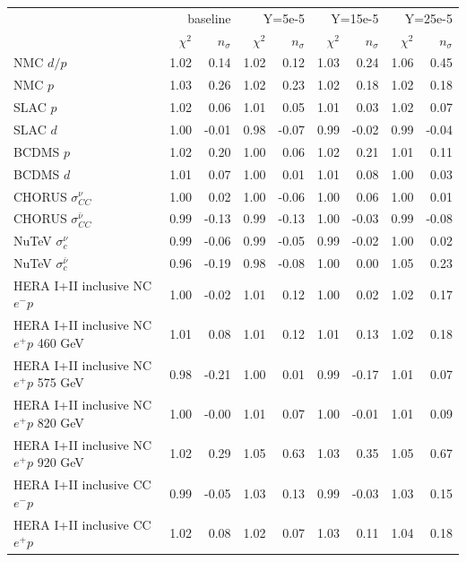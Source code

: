 \documentclass[withindex,glossary]{cam-thesis}
\begin{document}
\begin{table}[H]
        \tiny
        \centering
\label{tab:chi2_y}
\begin{tabular}{lrrrrrrrr}
\toprule
 & \multicolumn{2}{r}{baseline} & \multicolumn{2}{r}{Y=5e-5} & \multicolumn{2}{r}{Y=15e-5} & \multicolumn{2}{r}{Y=25e-5} \\
 & $\chi^2$ & $n_\sigma$ & $\chi^2$ & $n_\sigma$ & $\chi^2$ & $n_\sigma$ & $\chi^2$ & $n_\sigma$ \\
\midrule
NMC $d/p$ & 1.02 & 0.14 & 1.02 & 0.12 & 1.03 & 0.24 & 1.06 & 0.45 \\
NMC $p$ & 1.03 & 0.26 & 1.02 & 0.23 & 1.02 & 0.18 & 1.02 & 0.18 \\
SLAC $p$ & 1.02 & 0.06 & 1.01 & 0.05 & 1.01 & 0.03 & 1.02 & 0.07 \\
SLAC $d$ & 1.00 & -0.01 & 0.98 & -0.07 & 0.99 & -0.02 & 0.99 & -0.04 \\
BCDMS $p$ & 1.02 & 0.20 & 1.00 & 0.06 & 1.02 & 0.21 & 1.01 & 0.11 \\
BCDMS $d$ & 1.01 & 0.07 & 1.00 & 0.01 & 1.01 & 0.08 & 1.00 & 0.03 \\
CHORUS $\sigma_{CC}^{\nu}$ & 1.00 & 0.02 & 1.00 & -0.06 & 1.00 & 0.06 & 1.00 & 0.01 \\
CHORUS $\sigma_{CC}^{\bar{\nu}}$ & 0.99 & -0.13 & 0.99 & -0.13 & 1.00 & -0.03 & 0.99 & -0.08 \\
NuTeV $\sigma_{c}^{\nu}$ & 0.99 & -0.06 & 0.99 & -0.05 & 0.99 & -0.02 & 1.00 & 0.02 \\
NuTeV $\sigma_{c}^{\bar{\nu}}$ & 0.96 & -0.19 & 0.98 & -0.08 & 1.00 & 0.00 & 1.05 & 0.23 \\
HERA I+II inclusive NC $e^-p$ & 1.00 & -0.02 & 1.01 & 0.12 & 1.00 & 0.02 & 1.02 & 0.17 \\
HERA I+II inclusive NC $e^+p$ 460 GeV & 1.01 & 0.08 & 1.01 & 0.12 & 1.01 & 0.13 & 1.02 & 0.18 \\
HERA I+II inclusive NC $e^+p$ 575 GeV & 0.98 & -0.21 & 1.00 & 0.01 & 0.99 & -0.17 & 1.01 & 0.07 \\
HERA I+II inclusive NC $e^+p$ 820 GeV & 1.00 & -0.00 & 1.01 & 0.07 & 1.00 & -0.01 & 1.01 & 0.09 \\
HERA I+II inclusive NC $e^+p$ 920 GeV & 1.02 & 0.29 & 1.05 & 0.63 & 1.03 & 0.35 & 1.05 & 0.67 \\
HERA I+II inclusive CC $e^-p$ & 0.99 & -0.05 & 1.03 & 0.13 & 0.99 & -0.03 & 1.03 & 0.15 \\
HERA I+II inclusive CC $e^+p$ & 1.02 & 0.08 & 1.02 & 0.07 & 1.03 & 0.11 & 1.04 & 0.18 \\

\end{tabular}
\end{table}
\end{document}
